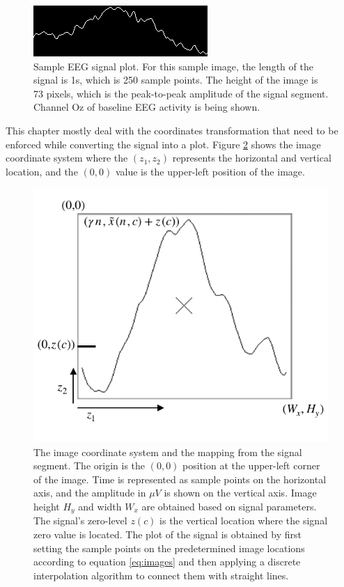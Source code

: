 \begin{figure}[]
\centering
\includegraphics[scale=1.5]{images/plottingsample.png}
\caption[EEG Signal Mapping to Images]{Sample EEG signal plot.  For this sample image, the length of the signal is 1s, which is 250 sample points.  The height of the image is 73 pixels, which is the peak-to-peak amplitude of the signal segment.  Channel Oz of baseline EEG activity is being shown.}
\label{fig:plottingsample}
\end{figure}

This chapter mostly deal with the coordinates transformation that need to be enforced while converting the signal into a plot.  Figure \ref{fig:imagecoordinatesystem} shows the image coordinate system where the $(z_1,z_2)$ represents the horizontal and vertical location, and the $(0,0)$ value is the upper-left position of the image.

\begin{figure}[h!]
\centering
\includegraphics[scale=1.2]{images/imagecoordinatesystem.pdf}
\caption[Image Coordinate System]{The image coordinate system and the mapping from the signal segment.  The origin is the $(0,0)$ position at the upper-left corner of the image.  Time is represented as sample points on the horizontal axis, and the amplitude in $\mu V$ is shown on the vertical axis. Image height $H_y$ and width $W_x$ are obtained based on signal parameters.  The signal's zero-level $z(c)$ is the vertical location where the signal zero value is located. The plot of the signal is obtained by first setting the sample points on the predetermined image locations according to equation \ref{eq:images} and then applying a discrete interpolation algorithm to connect them with straight lines. }
\label{fig:imagecoordinatesystem}
\end{figure}

